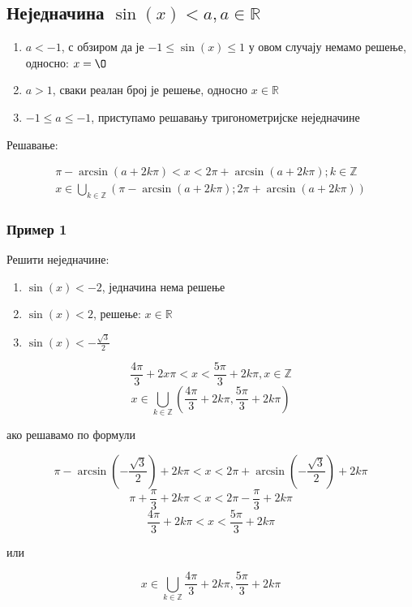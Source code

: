 \documentclass[../diplomski.tex]{subfiles}
\begin{document}
\subsection{Неједначина $\sin(x)<a,a\in\mathbb{R}$}

\begin{enumerate}[label=\alph*)]
\item $a<-1$, с обзиром да је $-1\leq\sin(x)\leq1$ у овом случају немамо решење, односно: $x=\O$
\item $a>1$, сваки реалан број је решење, односно $x\in\mathbb{R}$
\item $-1\leq a\leq-1$, приступамо решавању тригонометријске неједначине
\end{enumerate}

Решавање:



\begin{equation}
\begin{split}
\pi-\arcsin(a+2k\pi)<x<2\pi+\arcsin(a+2k\pi);k\in\mathbb{Z}\\
x\in\bigcup\limits_{k\in\mathbb{Z}}(\pi-\arcsin(a+2k\pi);2\pi+\arcsin(a+2k\pi))
\end{split}
\end{equation}


\subsubsection{Пример 1}

Решити неједначине:

\begin{enumerate}[label=\alph*)]
\item $\sin(x)<-2$, једначина нема решење
\item $\sin(x)<2$, решење: $x\in\mathbb{R}$
\item $\sin(x)<-\frac{\sqrt3}{2}$
\end{enumerate}



\[\frac{4\pi}{3}+2x\pi<x<\frac{5\pi}{3}+2k\pi,x\in\mathbb{Z}\]
\[x\in\bigcup_{k\in\mathbb{Z}}(\frac{4\pi}{3}+2k\pi,\frac{5\pi}{3}+2k\pi)\]

ако решавамо по формули

\[\pi-\arcsin\left(-\frac{\sqrt{3}}{2}\right)+2k\pi<x<2\pi+\arcsin\left(-\frac{\sqrt{3}}{2}\right)+2k\pi\]
\[\pi+\frac{\pi}{3}+2k\pi<x<2\pi-\frac{\pi}{3}+2k\pi\]
\[\frac{4\pi}{3}+2k\pi<x<\frac{5\pi}{3}+2k\pi\]
\centerline{или}
\[x\in\bigcup_{k\in\mathbb{Z}}\frac{4\pi}{3}+2k\pi,\frac{5\pi}{3}+2k\pi\]
\end{document}
